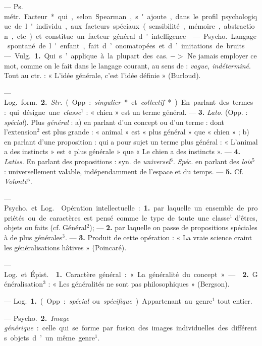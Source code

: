 
	\begin{itemize}[leftmargin=1cm, label=, itemsep=1pt]

 — \si{Ps. métr.} Facteur* qui, selon Spearman, s'ajoute,
dans le profil psychologique de l'individu, aux facteurs spéciaux
(sensibilité, mémoire, abstraction, etc.) et constitue un facteur général
d’intelligence.

 — \si{Psycho.} Langage spontané de l'enfant, fait
d’onomatopées et d’imitations de bruits.

 — \si{Vulg.} {\bf 1.} Qui s’applique à la plupart des cas.
$->$ Ne jamais employer ce mot, comme on le fait dans le langage courant,
au sens de : {\it vague, indéterminé}. Tout au ctr. : « L'idée générale,
c’est l’idée définie » (Burloud).

— \si{Log.} \si{form.} {\bf 2.} {\it Str.} (Opp. : {\it singulier}* et
{\it collectif}*). En parlant des termes : qui désigne une {\it classe}$^1$ :
« chien » est un terme général. — {\bf 3.} {\it Lato.} (Opp. :
{\it spécial}). Plus {\it général} : a) en parlant d’un concept ou d’un
terme : dont l'extension$^2$ est plus grande : « animal » est « plus
général » que « chien » ; b) en parlant d'une proposition : qui a pour
sujet un terme plus général : « L’animal a des instincts » est « plus
générale » que « Le chien a des instincts ». — {\bf 4.} {\it Latiss.} En
parlant des propositions : syn. de {\it universel}$^3$. {\it Spéc.} en
parlant des {\it lois}$^5$ : universellement valable, indépendamment de
l’espace et du temps. — {\bf 5.} Cf. {\it Volonté}$^5$.

 — \si{Psycho.} et \si{Log.} . Opération
intellectuelle : {\bf 1.} par laquelle un ensemble de propriétés ou de
caractères est pensé comme le type de toute une classe$^1$ d'êtres, objets ou
faits (cf. Général$^2$); — {\bf 2.} par laquelle on passe de propositions
spéciales à de plus générales$^3$. —  {\bf 3.} Produit de
cette opération : « La vraie science craint les généralisations hâtives »
(Poincaré).

 — \si{Log.} et \si{Épist.}  {\bf 1.} Caractère
général : « La généralité du concept ». —  {\bf 2.}
Généralisation$^3$ : « Les généralités ne sont pas philosophiques » (Bergson).

 — \si{Log.} {\bf 1.} (Opp. : {\it spécial}
ou {\it spécifique}). Appartenant au genre$^1$ tout entier.

— \si{Psycho.} {\bf 2.} {\it Image générique} : celle qui se forme par fusion
des images individuelles des différents objets d’un même genre$^1$.


\end{itemize}
